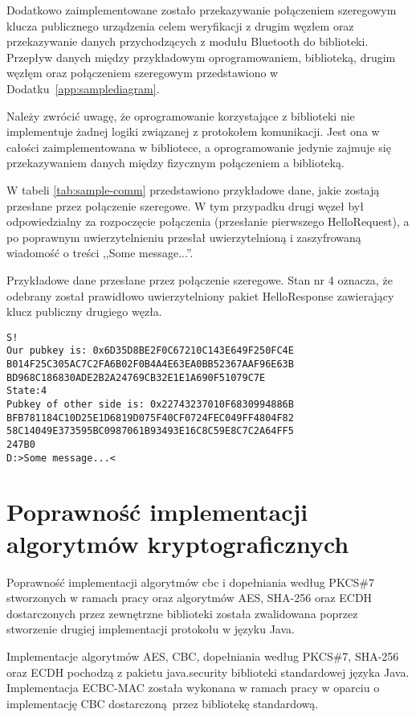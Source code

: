 Dodatkowo zaimplementowane zostało przekazywanie połączeniem szeregowym klucza publicznego urządzenia celem weryfikacji z drugim węzłem oraz przekazywanie danych przychodzących z modułu Bluetooth do biblioteki. Przepływ danych między przykładowym oprogramowaniem, biblioteką, drugim węzłęm oraz połączeniem szeregowym przedstawiono w Dodatku~\ref{app:samplediagram}.

Należy zwrócić uwagę, że oprogramowanie korzystające z biblioteki nie implementuje żadnej logiki związanej z protokołem komunikacji. Jest ona w całości zaimplementowana w bibliotece, a oprogramowanie jedynie zajmuje się przekazywaniem danych między fizycznym połączeniem a biblioteką.

W tabeli \ref{tab:sample-comm} przedstawiono przykładowe dane, jakie zostają przesłane przez połączenie szeregowe. W tym przypadku drugi węzeł był odpowiedzialny za rozpoczęcie połączenia (przesłanie pierwszego HelloRequest), a po poprawnym uwierzytelnieniu przesłał uwierzytelnioną i zaszyfrowaną wiadomość o treści ,,Some message...''.

\begin{table}
\centering
\caption{Przykładowe dane przesłane przez połączenie szeregowe. Stan nr 4 oznacza, że odebrany został prawidłowo uwierzytelniony pakiet HelloResponse zawierający klucz publiczny drugiego węzła.}
\begin{BVerbatim}
S!
Our pubkey is: 0x6D35D8BE2F0C67210C143E649F250FC4E
B014F25C305AC7C2FA6B02F0B4A4E63EA0BB52367AAF96E63B
BD968C186830ADE2B2A24769CB32E1E1A690F51079C7E
State:4
Pubkey of other side is: 0x22743237010F6830994886B
BFB781184C10D25E1D6819D075F40CF0724FEC049FF4804F82
58C14049E373595BC0987061B93493E16C8C59E8C7C2A64FF5
247B0
D:>Some message...<
\end{BVerbatim}
\label{tab:sample-comm}
\end{table}

\section{Poprawność implementacji algorytmów kryptograficznych}

Poprawność implementacji algorytmów \gls{cbc} i dopełniania według PKCS\#7 stworzonych w ramach pracy oraz algorytmów AES, SHA-256 oraz ECDH dostarczonych przez zewnętrzne biblioteki została zwalidowana poprzez stworzenie drugiej implementacji protokołu w języku Java.

Implementacje algorytmów AES, CBC, dopełniania według PKCS\#7, SHA-256 oraz ECDH pochodzą z pakietu java.security biblioteki standardowej języka Java. Implementacja ECBC-MAC została wykonana w ramach pracy w oparciu o implementację CBC dostarczoną przez bibliotekę standardową.
